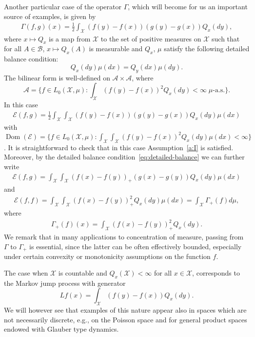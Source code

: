 \documentclass[a4paper]{amsart}
\theoremstyle{definition}
\theoremstyle{remark}
\numberwithin{equation}{section}
\newcommand{\calX}{\mathcal{X}}
\newcommand*{\calA}{\mathcal{A}}
\newcommand{\calB}{\mathcal{B}}
\DeclareMathOperator{\Dom}{Dom} %
\newcommand*{\calE}{\mathcal{E}}
\begin{document}
Another particular case of the operator $\Gamma$, which will become for us an important source of examples, is given by
\begin{align}\label{eq:Gamma-kernel}
\Gamma(f,g)(x) = \frac{1}{2}\int_\mathcal{X}(f(y) - f(x))(g(y) - g(x))Q_x(dy),
\end{align}
where $x\mapsto Q_x$ is a map from $\mathcal{X}$ to the set of positive measures on $\calX$ such that for all $A \in \calB$, $x\mapsto Q_x(A)$ is measurable and $Q_x$, $\mu$ satisfy the following detailed balance condition:
\begin{equation}\label{eq:detailed-balance}
  Q_x(dy)\mu(dx) = Q_y(dx)\mu(dy).
\end{equation}
The bilinear form is well-defined on $\calA\times \calA$, where
\begin{displaymath}
\calA = \{f\in L_0(\calX,\mu)\colon \int_\mathcal{X}(f(y) - f(x))^2Q_x(dy) < \infty \; \textrm{$\mu$-a.s.}\}.
\end{displaymath}
In this case
\begin{align}\label{eq:kernel-to-form}
  \calE(f,g) = \frac{1}{2}\int_\calX \int_\mathcal{X}(f(y) - f(x))(g(y) - g(x))Q_x(dy)\mu(dx)
\end{align}
with $\Dom(\calE) = \{f\in L_0(\mathcal{X},\mu)\colon \int_\calX\int_\calX (f(y)-f(x))^2Q_x(dy)\mu(dx) < \infty\}$. 
It is straightforward to check that in this case Assumption~\ref{a:I}  is satisfied.
Moreover, by the detailed balance condition~\eqref{eq:detailed-balance}
we can further write
\begin{align}\label{eq:bilinear-form-reversibility}
	  \calE(f,g) = \int_\calX \int_\mathcal{X}(f(x) - f(y))_+(g(x) - g(y))Q_x(dy)\mu(dx)
\end{align}
and
\begin{align}\label{eq:form-reversibility}
  \calE(f,f) = \int_\calX \int_\mathcal{X}(f(x) - f(y))_+^2Q_x(dy)\mu(dx) = \int_\calX \Gamma_+(f) d\mu,
\end{align}
where
\begin{align}\label{eq:Gamma+}
  \Gamma_+(f)(x) = \int_\mathcal{X}(f(x) - f(y))_+^2Q_x(dy).
\end{align}
We remark that in many applications to concentration of measure, passing from $\Gamma$ to $\Gamma_+$ is essential, since the latter can be often effectively bounded, especially under certain convexity or monotonicity assumptions on the function $f$.


The case when $\mathcal{X}$ is countable and $Q_x(\calX) < \infty$ for all $x \in \calX$, corresponds to the Markov jump process with generator
\begin{displaymath}
  L f(x) = \int_\calX (f(y) - f(x))Q_x(dy).
\end{displaymath}
We will however see that examples of this nature appear also in spaces which are not necessarily discrete, e.g., on the Poisson space and for general product spaces endowed with Glauber type dynamics.
\end{document}
